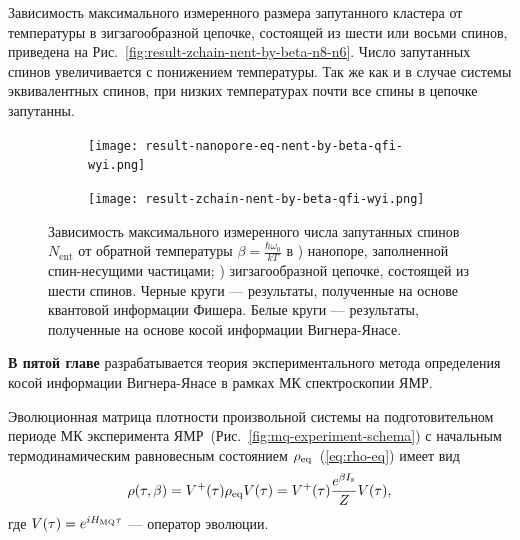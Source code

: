 Зависимость максимального измеренного размера запутанного кластера от температуры в зигзагообразной цепочке,
состоящей из шести или восьми спинов, приведена на Рис.~\ref{fig:result-zchain-nent-by-beta-n8-n6}.
Число запутанных спинов увеличивается с понижением температуры.
Так же как и в случае системы эквивалентных спинов,
при низких температурах почти все спины в цепочке запутанны.


\begin{figure}[H]
  \centering
  \begin{subfigure}[t]{0.49\textwidth}
    \texttt{[image: result-nanopore-eq-nent-by-beta-qfi-wyi.png]}
	\caption{}
	\label{fig:result-nanopore-eq-nent-by-beta-qfi-wyi}
  \end{subfigure}
  \hfill
  \begin{subfigure}[t]{0.49\textwidth}
    \texttt{[image: result-zchain-nent-by-beta-qfi-wyi.png]}
	\caption{}
	\label{fig:result-zchain-nent-by-beta-qfi-wyi}
  \end{subfigure}
  \caption{
    Зависимость максимального измеренного числа запутанных спинов~$N_\mathrm{ent}$
	от обратной температуры $\beta = \frac{\hbar \omega_0}{kT}$
    в ) нанопоре, заполненной спин-несущими частицами; 
    ) зигзагообразной цепочке, состоящей из шести спинов.
	Черные круги --- результаты, полученные на основе квантовой информации Фишера.
	Белые круги --- результаты, полученные на основе косой информации Вигнера-Янасе.
  }
  \label{fig:result-nent-by-beta-qfi-wyi}
\end{figure}

\textbf{В пятой главе} разрабатывается теория экспериментального метода определения косой информации Вигнера-Янасе в рамках МК спектроскопии ЯМР.

Эволюционная матрица плотности произвольной системы на
подготовительном периоде МК эксперимента ЯМР~(Рис.~\ref{fig:mq-experiment-schema})
с начальным термодинамическим равновесным состоянием $\rho_\mathrm{eq}$~(\ref{eq:rho-eq}) имеет вид
%
\begin{equation}\label{eq:rho-eval}
  \rho(\tau,\beta)
  = V^+(\tau) \rho_\mathrm{eq} V(\tau)
  = V^+(\tau) \frac{e^{\beta I_\mathrm{z}}}{Z} V(\tau),
\end{equation}
%
где $V(\tau) = e^{iH_\mathrm{MQ}\tau}$
---  оператор эволюции.


